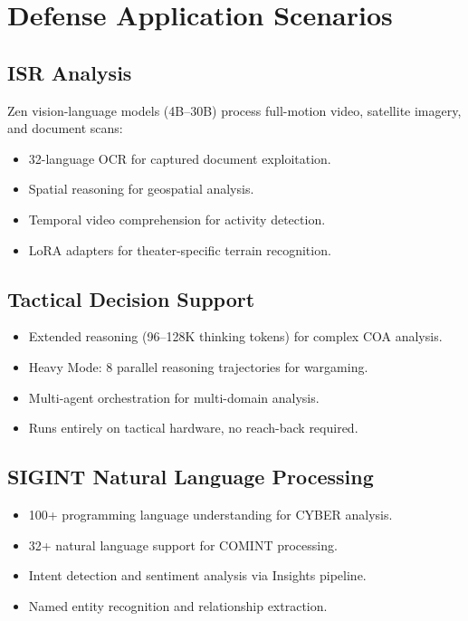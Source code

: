 \documentclass[11pt,letterpaper]{article}
\begin{document}
\section{Defense Application Scenarios}

\subsection{ISR Analysis}

Zen vision-language models (4B--30B) process full-motion video, satellite imagery, and document scans:
\begin{itemize}
\item 32-language OCR for captured document exploitation.
\item Spatial reasoning for geospatial analysis.
\item Temporal video comprehension for activity detection.
\item LoRA adapters for theater-specific terrain recognition.
\end{itemize}

\subsection{Tactical Decision Support}

\begin{itemize}
\item Extended reasoning (96--128K thinking tokens) for complex COA analysis.
\item Heavy Mode: 8 parallel reasoning trajectories for wargaming.
\item Multi-agent orchestration for multi-domain analysis.
\item Runs entirely on tactical hardware, no reach-back required.
\end{itemize}

\subsection{SIGINT Natural Language Processing}

\begin{itemize}
\item 100+ programming language understanding for CYBER analysis.
\item 32+ natural language support for COMINT processing.
\item Intent detection and sentiment analysis via Insights pipeline.
\item Named entity recognition and relationship extraction.
\end{itemize}
\end{document}
